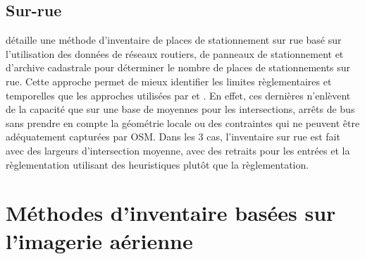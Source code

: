 \subsection{Sur-rue}
\textcite{Bourdeau:MethodologieAnalyse:2014} détaille une méthode d'inventaire de places de stationnement sur rue basé sur l'utilisation des données de réseaux routiers, de panneaux de stationnement et d'archive cadastrale pour déterminer le nombre de places de stationnements sur rue. Cette approche permet de mieux identifier les limites règlementaires et temporelles que les approches utilisées par \textcite{Chester:InventoryingSan:2022} et \textcite{Scharnhorst:QuantifiedParking:2018}. En effet, ces dernières n'enlèvent de la capacité que sur une base de moyennes pour les intersections, arrêts de bus sans prendre en compte la géométrie locale ou des contraintes qui ne peuvent être adéquatement capturées par \ac{OSM}. Dans les 3 cas, l'inventaire sur rue est fait avec des largeurs d'intersection moyenne, avec des retraits pour les entrées et la règlementation utilisant des heuristiques plutôt que la règlementation. \par
\section{Méthodes d'inventaire basées sur l'imagerie aérienne}

